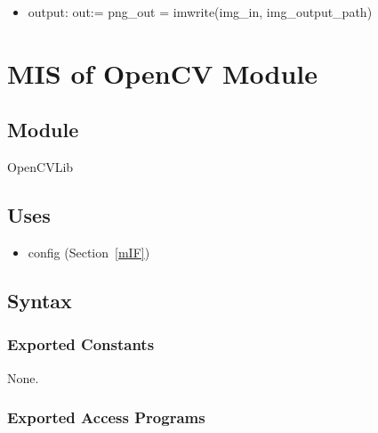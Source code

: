 \documentclass[12pt, titlepage]{article}
\begin{document}
\begin{itemize}
  \item output: out:= png\_out = imwrite(img\_in, img\_output\_path)
\end{itemize}




\section{MIS of OpenCV Module} \label{mOpenCV}


\subsection{Module}

OpenCVLib

\subsection{Uses}
\begin{itemize}
  \item config (Section~\ref{mIF})
\end{itemize}

\subsection{Syntax}

\subsubsection{Exported Constants}
None.

\subsubsection{Exported Access Programs}
\end{document}
